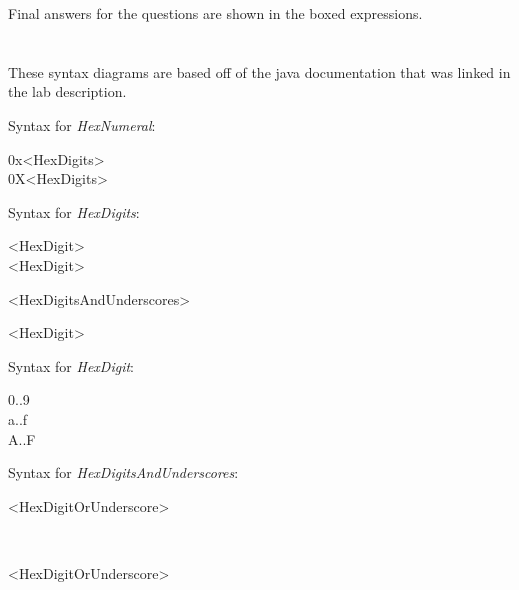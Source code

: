 \documentclass[12pt]{article}
\begin{document}
Final answers for the questions are shown in the boxed expressions. 

\section{}

These syntax diagrams are based off of the java documentation that was linked in the lab description.

\bigskip

Syntax for \textit{HexNumeral}:

\begin{syntdiag}
    \begin{stack} 
    	0x<HexDigits>\\
    	0X<HexDigits>
    \end{stack}
\end{syntdiag}

\bigskip

Syntax for \textit{HexDigits}:

\begin{syntdiag}
	\begin{stack}
		<HexDigit>\\
		<HexDigit>
			\begin{stack}
				<HexDigitsAndUnderscores>\\
			\end{stack}
		<HexDigit>
	\end{stack}
\end{syntdiag}

\bigskip

Syntax for \textit{HexDigit}:

\begin{syntdiag}
	\begin{stack}
		0..9\\
		a..f\\
		A..F
	\end{stack}
\end{syntdiag}

\bigskip

Syntax for \textit{HexDigitsAndUnderscores}:

\begin{syntdiag}
	\begin{stack}
		<HexDigitOrUnderscore>
		\begin{stack}
			\\
			\begin{rep}
				<HexDigitOrUnderscore>
			\end{rep}
		\end{stack}
	\end{stack}
\end{syntdiag}
\end{document}
